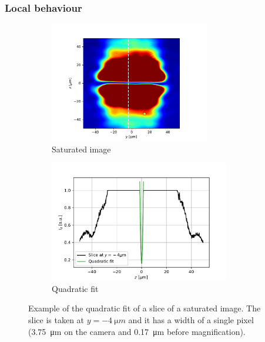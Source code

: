 \subsubsection{Local behaviour}
\begin{figure}
    \begin{subfigure}{0.45\textwidth}
        \centering
        \includegraphics[height=5.25cm]{chapters/chapter_3/figures/fitquad_imsat.pdf}
        \caption{Saturated image}
        \label{fig:parabola_imsat}
    \end{subfigure}
    \begin{subfigure}{0.55\textwidth}
        \includegraphics[height=5.25cm]{chapters/chapter_3/figures/fitquad.pdf}
        \caption{Quadratic fit}
        \label{fig:parabola_fit}
    \end{subfigure}
    \caption{Example of the quadratic fit of a slice of a saturated image. The slice is taken at $y=\SI{-4}{\micro m}$ and it has a width of a single pixel (\SI{3.75}{\micro m} on the camera and \SI{0.17}{\micro m} before magnification).}
    \label{fig:parabola}
\end{figure}

